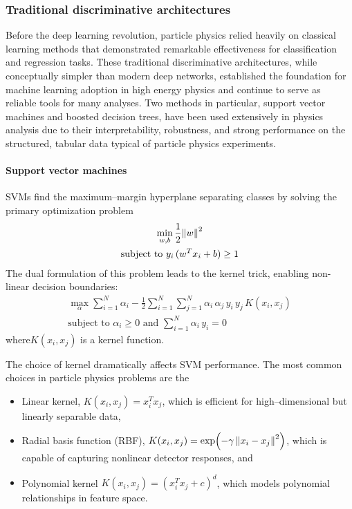         \subsubsection{Traditional discriminative architectures}
            Before the deep learning revolution, particle physics relied heavily on classical learning methods that demonstrated remarkable effectiveness for classification and regression tasks.
            These traditional discriminative architectures, while conceptually simpler than modern deep networks, established the foundation for machine learning adoption in high energy physics and continue to serve as reliable tools for many analyses.
            Two methods in particular, support vector machines and boosted decision trees, have been used extensively in physics analysis due to their interpretability, robustness, and strong performance on the structured, tabular data typical of particle physics experiments.
        \paragraph{Support vector machines}
            SVMs find the maximum--margin hyperplane separating classes by solving the primary optimization problem
            \begin{gather}
                \min_{w,b} \frac{1}{2}\norm{w}^2 \\ \text{subject to } y_i\,(w^T x_i + b) \geq 1
            \end{gather}
            The dual formulation of this problem leads to the kernel trick, enabling non-linear decision boundaries:
            \begin{gather}
                \max_{\alpha} \sum_{i=1}^N \alpha_i - \frac{1}{2}\sum_{i=1}^N\sum_{j=1}^N \alpha_i\,\alpha_j \,y_i\, y_j \,K(x_i,x_j)\\\text{subject to }\alpha_i\ge0 \text{ and } \sum_{i=1}^N \alpha_i \, y_i = 0
            \end{gather}
            where\(K(x_i,x_j)\) is a kernel function.
        
            The choice of kernel dramatically affects SVM performance.
            The most common choices in particle physics problems are the
            \begin{itemize}
                \item Linear kernel, \(K(x_i,x_j) = x_i^T x_j\), which is efficient for high--dimensional but linearly separable data,
                \item Radial basis function (RBF), \(K(x_i,x_j) = \exp(-\gamma\,\norm{x_i-x_j}^2)\), which is capable of capturing nonlinear detector responses, and
                \item Polynomial kernel \(K(x_i,x_j) = (x_i^T x_j + c)^d\), which models polynomial relationships in feature space.
            \end{itemize}
            
